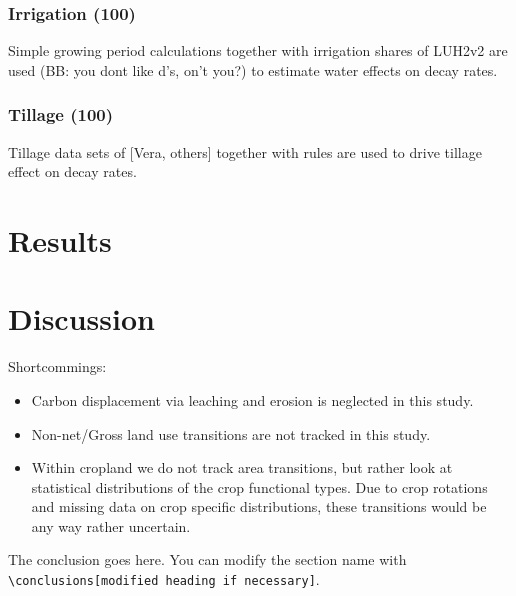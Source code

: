 \documentclass[gc, manuscript]{copernicus}
\begin{document}
\subsubsection{Irrigation (100)}

Simple growing period calculations together with irrigation shares of
LUH2v2 are used (BB: you dont like d's, on't you?) to estimate water
effects on decay rates.

\subsubsection{Tillage (100)}

Tillage data sets of {[}Vera, others{]} together with rules are used to
drive tillage effect on decay rates. \newpage

\section{Results}

\newpage

\section{Discussion}

Shortcommings:

\begin{itemize}
\item
  Carbon displacement via leaching and erosion is neglected in this
  study.
\item
  Non-net/Gross land use transitions are not tracked in this study.
\item
  Within cropland we do not track area transitions, but rather look at
  statistical distributions of the crop functional types. Due to crop
  rotations and missing data on crop specific distributions, these
  transitions would be any way rather uncertain. \newpage
\end{itemize}

\conclusions

The conclusion goes here. You can modify the section name with
\texttt{\textbackslash{}conclusions{[}modified\ heading\ if\ necessary{]}}.
\newpage




\end{document}
